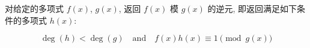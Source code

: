对给定的多项式 \(f(x)\), \(g(x)\), 返回 \(f(x)\) 模 \(g(x)\) 的逆元, 即返回满足如下条件的多项式 \(h(x)\):

\[
    \deg(h)<\deg(g) \quad\text{and}\quad f(x)h(x)\equiv 1\pmod{g(x)}
\]
